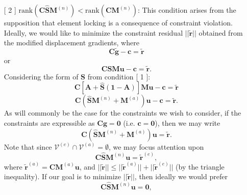 \documentclass[12pt]{article}
\begin{document}
\begin{itemize}
        \item[[ 2]] $\mbox{rank}(\mathbf{C} \hat{\mathbf{S}} \mathbf{M}^{(n)}) < \mbox{rank}(\mathbf{CM}^{(n)})$:  This condition arises from the supposition that element locking is a consequence of constraint violation. Ideally, we would like to minimize the constraint residual $||\tilde{\mathbf{r}}||$ obtained from the modified displacement gradients, where
        \begin{equation}
                \mathbf{C} \tilde{\mathbf{g}} - \mathbf{c} = \tilde{\mathbf{r}}
        \end{equation}
        or
        \begin{equation}
                \mathbf{C} \mathbf{S} \mathbf{M} \mathbf{u} - \mathbf{c} = \tilde{\mathbf{r}}.
        \end{equation}
        Considering the form of $\mathbf{S}$ from condition [ 1 ]:
        \begin{equation}
                \mathbf{C} \left[ \mathbf{A} + \hat{\mathbf{S}} (\mathbf{1} - \mathbf{A}) \right] \mathbf{M} \mathbf{u} - \mathbf{c} = \tilde{\mathbf{r}}
        \end{equation}
        \begin{equation}
                \mathbf{C} (\hat{\mathbf{S}} \mathbf{M}^{(n)} + \mathbf{M}^{(a)}) \mathbf{u} - \mathbf{c} = \tilde{\mathbf{r}}.
        \end{equation}
        As will commonly be the case for the constraints we wish to consider, if the constraints are expressible as $\mathbf{C} \mathbf{g} = \mathbf{0}$ (i.e. $\mathbf{c} = \mathbf{0}$), then we may write
        \begin{equation}
                \mathbf{C} (\hat{\mathbf{S}} \mathbf{M}^{(n)} + \mathbf{M}^{(a)}) \mathbf{u} = \tilde{\mathbf{r}}.
        \end{equation}
        Note that since $\mathcal{V}^{(e)} \cap \mathcal{V}^{(a)} = \emptyset$, we may focus attention upon
        \begin{equation}
                \mathbf{C} \hat{\mathbf{S}} \mathbf{M}^{(n)} \mathbf{u} = \tilde{\mathbf{r}}^{(e)},
        \end{equation}
        where $\tilde{\mathbf{r}}^{(a)} = \mathbf{C} \mathbf{M}^{(a)} \mathbf{u}$, and $||\tilde{\mathbf{r}}|| \leq ||\tilde{\mathbf{r}}^{(a)}|| + ||\tilde{\mathbf{r}}^{(e)}||$ (by the triangle inequality). If our goal is to minimize $||\tilde{\mathbf{r}}||$, then ideally we would prefer
        \begin{equation}
               \mathbf{C} \hat{\mathbf{S}} \mathbf{M}^{(n)} \mathbf{u} = \mathbf{0},

\end{equation}
\end{itemize}
\end{document}
